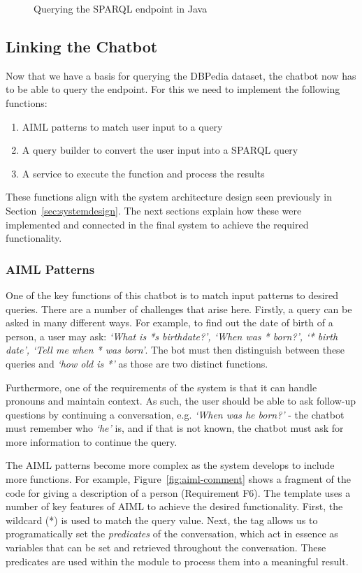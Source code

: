 \begin{figure}[h]
	\centering
	\qquad
	\caption{Querying the SPARQL endpoint in Java}
	\label{fig:querysparql}
\end{figure}

\subsection{Linking the Chatbot}
Now that we have a basis for querying the DBPedia dataset, the chatbot now has to be able to query the endpoint. For this we need to implement the following functions:
\begin{enumerate}
	\item AIML patterns to match user input to a query
	\item A query builder to convert the user input into a SPARQL query
	\item A service to execute the function and process the results
\end{enumerate}
These functions align with the system architecture design seen previously in Section~\ref{sec:systemdesign}. The next sections explain how these were implemented and connected in the final system to achieve the required functionality.

\subsubsection{AIML Patterns}
One of the key functions of this chatbot is to match input patterns to desired queries. There are a number of challenges that arise here. Firstly, a query can be asked in many different ways. For example, to find out the date of birth of a person, a user may ask: {\it`What is *s birthdate?', `When was * born?', `* birth date', `Tell me when * was born'}. The bot must then distinguish between these queries and {\it`how old is *'} as those are two distinct functions.

Furthermore, one of the requirements of the system is that it can handle pronouns and maintain context. As such, the user should be able to ask follow-up questions by continuing a conversation, e.g. {\it `When was he born?'} - the chatbot must remember who {\it `he'} is, and if that is not known, the chatbot must ask for more information to continue the query.

The AIML patterns become more complex as the system develops to include more functions. For example, Figure~\ref{fig:aiml-comment} shows a fragment of the code for giving a description of a person (Requirement F6). The template uses a number of key features of AIML to achieve the desired functionality.
First, the wildcard (*) is used to match the query value. Next, the  tag allows us to programatically set the {\it{predicates}} of the conversation, which act in essence as variables that can be set and retrieved throughout the conversation. These predicates are used within the  module to process them into a meaningful result.

